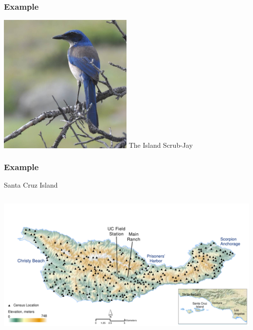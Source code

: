 \documentclass[color=usenames,dvipsnames]{beamer}\usepackage[]{graphicx}\usepackage[]{color}
\begin{document}
\begin{frame}[plain]
  \frametitle{Example}
  \Huge
  \begin{center}
    \includegraphics[width=0.5\textwidth]{figs/issj}
    The Island Scrub-Jay
  \end{center}
\end{frame}



\begin{frame}[plain]
  \frametitle{Example}
  \Huge
  \centering
    Santa Cruz Island \\
  \begin{columns}
    \column{\dimexpr\paperwidth-20pt}
    \includegraphics[width=\textwidth]{figs/Santa-Cruz} \\
  \end{columns}
\end{frame}
\end{document}
